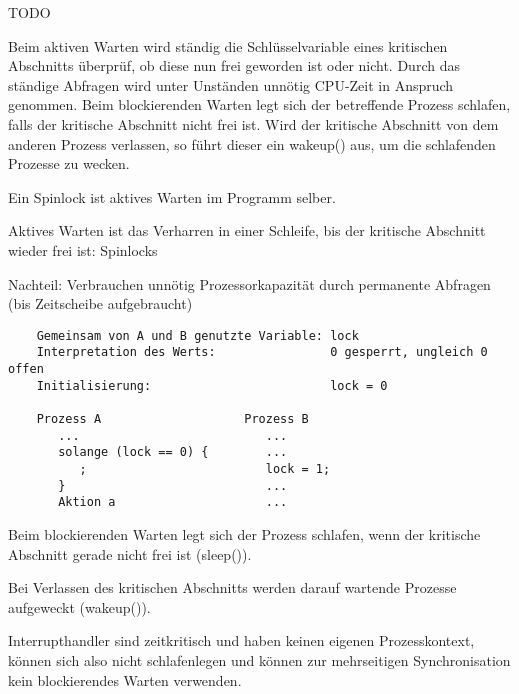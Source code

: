 \begin{answer}
TODO
\end{answer}

\begin{answer}
Beim aktiven Warten wird ständig die Schlüsselvariable eines kritischen Abschnitts überprüf, ob diese nun frei geworden ist oder nicht. Durch das ständige Abfragen wird unter Unständen unnötig CPU-Zeit in Anspruch genommen.
Beim blockierenden Warten legt sich der betreffende Prozess schlafen, falls der kritische Abschnitt nicht frei ist. Wird der kritische Abschnitt von dem anderen Prozess verlassen, so führt dieser ein wakeup() aus, um die schlafenden Prozesse zu wecken.
\end{answer}

\begin{answer}
Ein Spinlock ist aktives Warten im Programm selber.
\end{answer}

\begin{answer}
Aktives Warten ist das Verharren in einer Schleife, bis der kritische Abschnitt wieder frei ist: Spinlocks

Nachteil: Verbrauchen unnötig Prozessorkapazität durch permanente Abfragen (bis Zeitscheibe aufgebraucht)

\begin{verbatim}
    Gemeinsam von A und B genutzte Variable: lock
    Interpretation des Werts:                0 gesperrt, ungleich 0 offen 
    Initialisierung:                         lock = 0
           
    Prozess A                    Prozess B
       ...                          ...
       solange (lock == 0) {        ...
          ;                         lock = 1;
       }                            ...
       Aktion a                     ...
\end{verbatim}
\end{answer}

\begin{answer}
Beim blockierenden Warten legt sich der Prozess schlafen, wenn der kritische Abschnitt gerade nicht frei ist (sleep()).

Bei Verlassen des kritischen Abschnitts werden darauf wartende Prozesse aufgeweckt (wakeup()).

Interrupthandler sind zeitkritisch und haben keinen eigenen Prozesskontext, können sich also nicht schlafenlegen und können zur mehrseitigen Synchronisation kein blockierendes Warten verwenden.
\end{answer}

